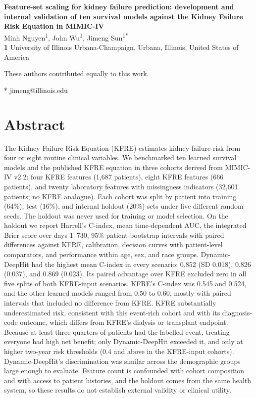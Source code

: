 \documentclass[10pt,letterpaper]{article}
\begin{document}
\vspace*{0.2in}

\begin{flushleft}
{\Large
\textbf{Feature-set scaling for kidney failure prediction: development and internal validation of ten survival models against the Kidney Failure Risk Equation in MIMIC-IV}
}
\newline
\\
Minh Nguyen\textsuperscript{1\Yinyang},
John Wu\textsuperscript{1\Yinyang},
Jimeng Sun\textsuperscript{1*}
\\
\bigskip
\textbf{1} University of Illinois Urbana-Champaign, Urbana, Illinois, United States of America
\\
\bigskip

\Yinyang These authors contributed equally to this work.

* jimeng@illinois.edu

\end{flushleft}

\section*{Abstract}
The Kidney Failure Risk Equation (KFRE) estimates kidney failure risk from four or eight routine clinical variables. We benchmarked ten learned survival models and the published KFRE equation in three cohorts derived from MIMIC-IV v2.2: four KFRE features (1{,}687 patients), eight KFRE features (666 patients), and twenty laboratory features with missingness indicators (32{,}601 patients; no KFRE analogue). Each cohort was split by patient into training (64\%), test (16\%), and internal holdout (20\%) sets under five different random seeds. The holdout was never used for training or model selection. On the holdout we report Harrell's C-index, mean time-dependent AUC, the integrated Brier score over days 1--730, 95\% patient-bootstrap intervals with paired differences against KFRE, calibration, decision curves with patient-level comparators, and performance within age, sex, and race groups. Dynamic-DeepHit had the highest mean C-index in every scenario: 0.852 (SD 0.018), 0.826 (0.037), and 0.869 (0.023). Its paired advantage over KFRE excluded zero in all five splits of both KFRE-input scenarios. KFRE's C-index was 0.545 and 0.524, and the other learned models ranged from 0.50 to 0.60, mostly with paired intervals that included no difference from KFRE. KFRE substantially underestimated risk, consistent with this event-rich cohort and with its diagnosis-code outcome, which differs from KFRE's dialysis or transplant endpoint. Because at least three-quarters of patients had the labelled event, treating everyone had high net benefit; only Dynamic-DeepHit exceeded it, and only at higher two-year risk thresholds (0.4 and above in the KFRE-input cohorts). Dynamic-DeepHit's discrimination was similar across the demographic groups large enough to evaluate. Feature count is confounded with cohort composition and with access to patient histories, and the holdout comes from the same health system, so these results do not establish external validity or clinical utility.
\end{document}
